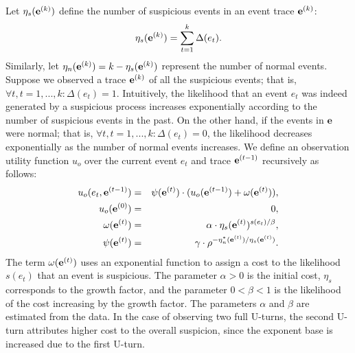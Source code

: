 Let $\eta_s(\mathbf{e}^{\scriptsize(k)})$ define the number of suspicious events in an event trace $\mathbf{e}^{\scriptsize(k)}$:
\begin{equation}
        \eta_s(\mathbf{e}^{\scriptsize(k)}) = \sum_{t=1}^k\Delta(e_t).
\end{equation}
Similarly, let $\eta_n(\mathbf{e}^{\scriptsize(k)}) = k - \eta_s(\mathbf{e}^{\scriptsize(k)})$ represent the number of normal events. 
%
Suppose we observed a trace $\mathbf{e}^{\scriptsize(k)}$ of all the suspicious events; that is, $\forall t, t=1,...,k: \Delta(e_t) = 1$. Intuitively, %
the likelihood that an event $e_t$ was indeed generated by a suspicious process increases exponentially according to the number of suspicious events in the past. %
On the other hand, if the events in $\mathbf{e}$ were normal; that is, $\forall t, t=1,...,k: \Delta(e_t) = 0$, the likelihood decreases exponentially as the number of normal events increases.
We define an observation utility function $u_o$ over the current event $e_t$ and trace $\mathbf{e}^{\scriptsize(t-1)}$ recursively as follows:
\begin{eqnarray}
\label{eq:fe}
        u_o(e_t, \mathbf{e}^{\scriptsize(t-1)}) &=& \psi(\mathbf{e}^{\scriptsize(t)}) \cdot (u_o(\mathbf{e}^{\scriptsize(t-1)}) + \omega(\mathbf{e}^{\scriptsize(t)})),\\
		u_o(\mathbf{e}^{\scriptsize(0)}) &=& 0,\nonumber\\
		\omega(\mathbf{e}^{\scriptsize(t)}) &=& \alpha \cdot \eta_s(\mathbf{e}^{\scriptsize(t)})^{s(e_t) / \beta},\\
		\psi(\mathbf{e}^{\scriptsize(t)}) &=& \gamma \cdot \rho^{{-\eta^*_n(\mathbf{e}^{\scriptsize(t)})}/{\eta_s(\mathbf{e}^{\scriptsize(t)})}}.
\end{eqnarray}
The term $\omega(\mathbf{e}^{\scriptsize(t)})$ uses an exponential function to assign a cost to the likelihood $s(e_t)$ that an event is suspicious. The parameter $\alpha > 0$ is the initial cost,  $\eta_s$ corresponds to the growth factor, and the parameter $0 < \beta < 1$ is the likelihood of the cost increasing by the growth factor. The parameters $\alpha$ and $\beta$ are estimated from the data. In the case of observing two full U-turns, the second U-turn attributes higher cost to the overall suspicion, since the exponent base is increased due to the first U-turn.


